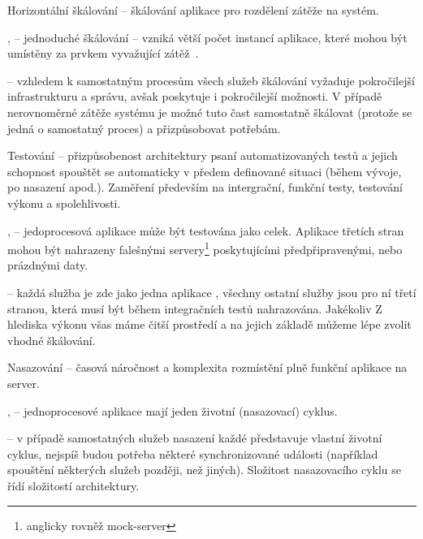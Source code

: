 \begin{dl}
   \item[Horizontální škálování] – škálování aplikace pro rozdělení zátěže na systém.
\end{dl}
\begin{ul}
   \item {},  – jednoduché škálování – vzniká větší počet instancí aplikace, které mohou být umístěny za prvkem vyvažující zátěž~\cite{msachris}.
   \item {} – vzhledem k samostatným procesům všech služeb škálování vyžaduje pokročilejší infrastrukturu a správu, avšak poskytuje i pokročilejší možnosti.
   V případě nerovnoměrné zátěže systému je možné tuto čast samostatně škálovat (protože se jedná o samostatný proces) a přizpůsobovat potřebám.
\end{ul}

\begin{dl}
   \item[Testování] – přizpůsobenost architektury psaní automatizovaných testů a jejich schopnost spouštět se automaticky v předem definované situaci (během vývoje, po nasazení apod.).
   Zaměření především na intergrační, funkční testy, testování výkonu a spolehlivosti.
\end{dl}
\begin{ul}
   \item {},  – jedoprocesová aplikace může být testována jako celek.
   Aplikace třetích stran mohou být nahrazeny falešnými servery\footnote{anglicky rovněž mock-server} poskytujícími předpřipravenými, nebo prázdnými daty.
   \item {} – každá služba je zde jako jedna aplikace , všechny ostatní služby jsou pro ní třetí stranou, která musí být během integračních testů nahrazována.
   Jakékoliv
   Z hlediska výkonu všas máme čitší prostředí a na jejich základě můžeme lépe zvolit vhodné škálování.
\end{ul}

\begin{dl}
   \item[Nasazování] – časová náročnost a komplexita rozmístění plně funkční aplikace na server.
\end{dl}
\begin{ul}
   \item {},  – jednoprocesové aplikace mají jeden životní (nasazovací) cyklus.
   \item {} – v případě samostatných služeb nasazení každé představuje vlastní životní cyklus, nejspíš budou potřeba některé synchronizované události (například spouštění některých služeb později, než jiných).
   Složitost nasazovacího cyklu se řídí složitostí architektury.
\end{ul}

